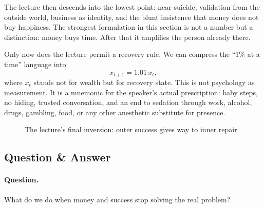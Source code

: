 The lecture then descends into the lowest point: near-suicide, validation from the outside world, business as identity, and the blunt insistence that money does not buy happiness. The strongest formulation in this section is not a number but a distinction: money buys time. After that it amplifies the person already there.

Only now does the lecture permit a recovery rule. We can compress the ``1\% at a time'' language into
\begin{equation}
x_{t+1}=1.01\,x_t,
\end{equation}
where \(x_t\) stands not for wealth but for recovery state. This is not psychology as measurement. It is a mnemonic for the speaker's actual prescription: baby steps, no hiding, trusted conversation, and an end to sedation through work, alcohol, drugs, gambling, food, or any other anesthetic substitute for presence.

\begin{figure}[h]
\centering
{}
\caption{The lecture's final inversion: outer success gives way to inner repair}
\end{figure}

\subsection{Question \& Answer}

\paragraph{Question.} What do we do when money and success stop solving the real problem?

